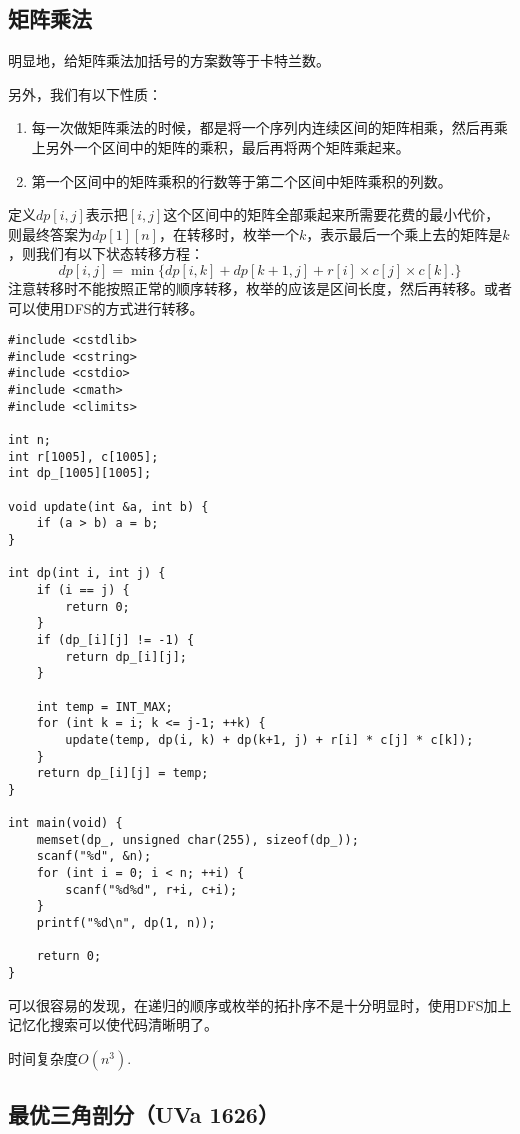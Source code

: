 \subsection{矩阵乘法}
明显地，给矩阵乘法加括号的方案数等于卡特兰数。

另外，我们有以下性质：
\begin{enumerate}
    \item{每一次做矩阵乘法的时候，都是将一个序列内连续区间的矩阵相乘，然后再乘上另外一个区间中的矩阵的乘积，最后再将两个矩阵乘起来。}
    \item{第一个区间中的矩阵乘积的行数等于第二个区间中矩阵乘积的列数。}
\end{enumerate}

定义$dp[i,j]$表示把$[i,j]$这个区间中的矩阵全部乘起来所需要花费的最小代价，则最终答案为$dp[1][n]$，在转移时，枚举一个$k$，表示最后一个乘上去的矩阵是$k$，则我们有以下状态转移方程：
\begin{equation*}
    dp[i,j]=\min\{dp[i,k]+dp[k+1,j]+r[i]\times c[j]\times c[k].\}
\end{equation*}
注意转移时不能按照正常的顺序转移，枚举的应该是区间长度，然后再转移。或者可以使用DFS的方式进行转移。
\begin{verbatim}
#include <cstdlib>
#include <cstring>
#include <cstdio>
#include <cmath>
#include <climits>

int n;
int r[1005], c[1005];
int dp_[1005][1005];

void update(int &a, int b) {
    if (a > b) a = b;
}

int dp(int i, int j) {
    if (i == j) {
        return 0;
    }
    if (dp_[i][j] != -1) {
        return dp_[i][j];
    }

    int temp = INT_MAX;
    for (int k = i; k <= j-1; ++k) {
        update(temp, dp(i, k) + dp(k+1, j) + r[i] * c[j] * c[k]);
    }
    return dp_[i][j] = temp;
}

int main(void) {
    memset(dp_, unsigned char(255), sizeof(dp_));
    scanf("%d", &n);
    for (int i = 0; i < n; ++i) {
        scanf("%d%d", r+i, c+i);
    }
    printf("%d\n", dp(1, n));

    return 0;
}
\end{verbatim}

可以很容易的发现，在递归的顺序或枚举的拓扑序不是十分明显时，使用DFS加上记忆化搜索可以使代码清晰明了。

时间复杂度$O(n^3)$.
\subsection{最优三角剖分（UVa 1626）}

